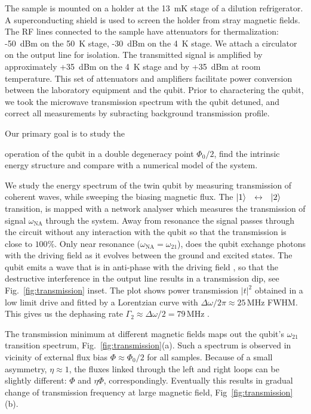 \documentclass[%
reprint,
superscriptaddress,
bibnotes,
amsmath,
amssymb,
aps,
showkeys,
prb,
]{revtex4-2}
\newcommand{\iket}[1]{\ensuremath{\Ket{#1}}}
\newcommand{\ilra}{\ensuremath{\,\leftrightarrow\,}}
\begin{document}
The sample is mounted on a holder at the 13~mK
stage of  a dilution refrigerator.  A  superconducting shield is used  to screen
the holder  from stray magnetic  fields.  The RF  lines connected to  the sample
have attenuators for thermalization: -50~dBm on  the 50~K stage, -30~dBm on the
4~K  stage.  We  attach a  circulator on  the output  line for  isolation.  The
transmitted signal is amplified  by approximately +35~dBm on the 4~K stage  and by +35~dBm at
room  temperature.  This  set  of attenuators  and  amplifiers facilitate  power
conversion  between the  laboratory equipment  and the qubit.  Prior  to
charactering the qubit,  we  took  the microwave  transmission
spectrum with the qubit detuned, and  correct all measurements by subracting background
transmission profile.

Our primary goal  is to study the

operation of the qubit in a double degeneracy point $\Phi_0/2$, find the intrinsic energy structure
and  compare with a numerical model of the system.

We study the energy  spectrum  of the  twin qubit  by measuring transmission of coherent waves,  while  sweeping  the  biasing  magnetic flux.   
The  \iket{1}~\ilra~\iket{2}  transition, is  mapped  with a  network
analyser which measures  the transmission of signal  $\omega_{\text{NA}}$ through the
system.
Away from  resonance the signal passes through the  circuit without any
interaction with the qubit so that the transmission
is close to  $ 100\% $.  Only near resonance  ($\omega_{\text{NA}}=\omega_{21}$), does the
qubit exchange photons  with the driving field as it  evolves between the ground
and excited states.  The  qubit emits a wave that is in anti-phase with
the driving  field \cite{Abdumalikov_2010}, so that the  destructive interference in
the output line results in  a transmission dip, see Fig.~\ref{fig:transmission} inset. The plot shows power transmission $|t|^2$ obtained in a low limit drive and fitted by a Lorentzian curve with 
$\Delta\omega/2\pi\approx25\,\text{MHz}$ FWHM. This gives us the dephasing rate $\Gamma_2 \approx \Delta\omega/2 = 79\,\text{MHz}$ 
\cite{Astafiev_2010}.  

The transmission minimum at different magnetic fields
maps   out   the   qubit's   $\omega_{21}$  transition   spectrum, Fig.~\ref{fig:transmission}(a). 
Such a spectrum is observed in vicinity of external flux bias $\Phi \approx \Phi_0/2$ for all samples. 
Because  of  a  small
asymmetry, $\eta\approx1$, the fluxes linked through  the left and right loops can be slightly
different: $ \Phi$ and $ \eta\Phi $, correspondingly. Eventually this results in gradual change of transmission frequency at large magnetic field, Fig~\ref{fig:transmission}(b).
\end{document}
